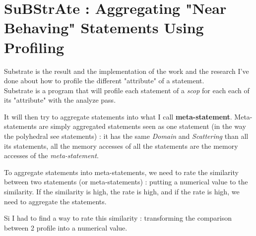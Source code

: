 \documentclass[paper=a4, fontsize=11pt]{scrartcl}
\numberwithin{equation}{section}        %
\numberwithin{figure}{section}          %
\numberwithin{table}{section}               %
\begin{document}
\section{SuBStrAte : Aggregating "Near Behaving" Statements Using Profiling}
    Substrate is the result and the implementation of the work and the research I've done
    about how to profile the different "attribute" of a statement.\\
    Substrate is a program that will profile each statement of a \textit{scop} for
    each each of its "attribute" with the analyze pass.

    It will then try to aggregate
    statements into what I call \textbf{meta-statement}. Meta-statements are simply
    aggregated statements seen as one statement (in the way the polyhedral see statements)
    : it has the same \textit{Domain} and \textit{Scattering} than all its statements,
    all the memory accesses of all the statements are the memory accesses of the \textit{meta-statement}.

    To aggregate statements into meta-statements, we need to rate the similarity between two
    statements (or meta-statements) : putting a numerical value to the similarity.
    If the similarity is high, the rate is high, and if the rate is high, we need to
    aggregate the statements.

    Si I had to find a way to rate this similarity : transforming the comparison between
    2 profile into a numerical value.
\end{document}
